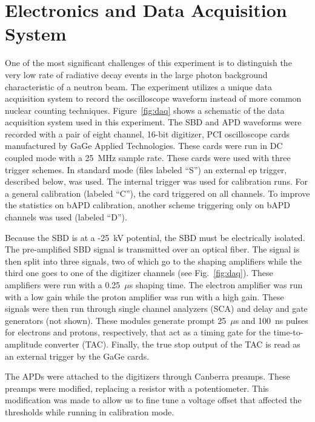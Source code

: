 \documentclass[oneside,12pt]{memoir}
\begin{document}
\section{Electronics and Data Acquisition System}
\label{sec:daq}
One of the most significant challenges of this experiment is to distinguish the very low rate of radiative decay events in the large photon background characteristic of a neutron beam. The experiment utilizes a unique data acquisition system to record the oscilloscope waveform instead of more common nuclear counting techniques. Figure~\ref{fig:daq} shows a schematic of the data acquisition system used in this experiment. The SBD and APD waveforms were recorded with a pair of eight channel, 16-bit digitizer, PCI oscilloscope cards manufactured by GaGe Applied Technologies. These cards were run in DC coupled mode with a 25~MHz sample rate. These cards were used with three trigger schemes. In standard mode (files labeled ``S'') an external ep trigger, described below, was used. The internal trigger was used for calibration runs. For a general calibration (labeled ``C''), the card triggered on all channels. To improve the statistics on bAPD calibration, another scheme triggering only on bAPD channels was used (labeled ``D'').\par
Because the SBD is at a -25~kV potential, the SBD must be electrically isolated. The pre-amplified SBD signal is transmitted over an optical fiber. The signal is then split into three signals, two of which go to the shaping amplifiers while the third one goes to one of the digitizer channels (see Fig.~\ref{fig:daq}). These amplifiers were run with a 0.25~$\mu$s shaping time. The electron amplifier was run with a low gain while the proton amplifier was run with a high gain. These signals were then run through single channel analyzers (SCA) and delay and gate generators (not shown). These modules generate prompt 25~$\mu$s and 100~ns pulses for electrons and protons, respectively, that act as a timing gate for the time-to-amplitude converter (TAC). Finally, the true stop output of the TAC is read as an external trigger by the GaGe cards.\par
The APDs were attached to the digitizers through Canberra preamps. These preamps were modified, replacing a resistor with a potentiometer. This modification was made to allow us to fine tune a voltage offset that affected the thresholds while running in calibration mode.\par
\end{document}
